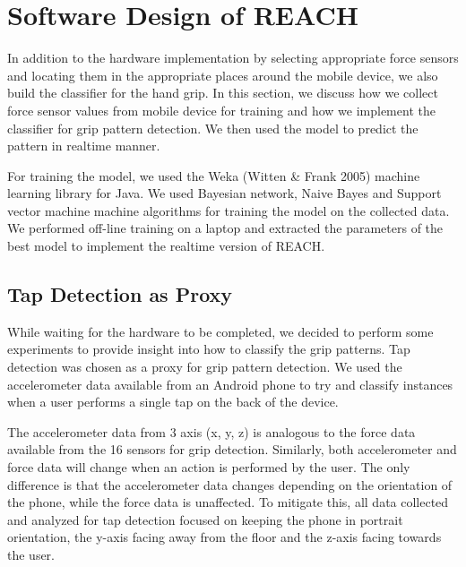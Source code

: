 \section{Software Design of REACH}
In addition to the hardware implementation by selecting appropriate force sensors and locating them in the appropriate places around the mobile device, we also build the classifier for the hand grip. In this section, we discuss how we collect force sensor values from mobile device for training and how we implement the classifier for grip pattern detection. We then used the model to predict the pattern in realtime manner. 
\par
For training the model,  we used the Weka (Witten \& Frank 2005) machine learning library for Java. We used Bayesian network, Naive Bayes and Support vector machine machine algorithms for training the model on the collected data. We performed off-line training on a laptop and extracted the parameters of the best model to implement the realtime version of REACH.

\subsection{Tap Detection as Proxy}
While waiting for the hardware to be completed, we decided to perform some experiments to provide insight into how to  classify the grip patterns. Tap detection was chosen as a proxy for grip pattern detection. We used the accelerometer data available from an Android phone to try and classify instances when a user performs a single tap on the back of the device. 
\par
The accelerometer data from 3 axis (x, y, z) is analogous to the force data available from the 16 sensors for grip detection. Similarly, both accelerometer and force data will change when an action is performed by the user. The only difference is that the accelerometer data changes depending on the orientation of the phone, while the force data is unaffected. To mitigate this, all data collected and analyzed for tap detection focused on keeping the phone in portrait orientation, the y-axis facing away from the floor and the z-axis facing towards the user.

